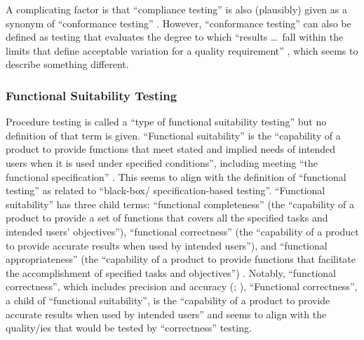 A complicating factor is that ``compliance testing'' is also
(plausibly) given as a synonym of ``conformance testing''
\citep[p.~43]{Kam2008}. However, ``conformance
testing'' can also be defined as testing that evaluates the degree
to which ``results \dots\ fall within the limits that define
acceptable variation for a quality requirement''
\citep[p.~93]{IEEE2017}, which seems to
describe something different.


\subsubsection{Functional Suitability Testing}
Procedure testing is
called a ``type of functional suitability testing''
\citep[p.~7]{IEEE2022} but no definition of that term is given.
``Functional suitability'' is the
``capability of a product to provide functions that meet stated and
implied needs of intended users when it is used under specified
conditions'', including meeting ``the functional specification''
\citep{ISO_IEC2023a}. This seems to align with the definition of
``functional testing'' as related to ``black-box/%
specification-based testing''.
\ifnotpaper
    ``Functional suitability'' has
    three child terms: ``functional completeness'' (the ``capability of
    a product to provide a set of functions that covers all the
    specified tasks and intended users' objectives''), ``functional
    correctness'' (the ``capability of a product to provide accurate
    results when used by intended users''), and ``functional
    appropriateness'' (the ``capability of a product to provide
    functions that facilitate the accomplishment of specified tasks and
    objectives'') \citep{ISO_IEC2023a}. Notably, ``functional
    correctness'', which includes precision and accuracy
    (\citealp{ISO_IEC2023a}; \citealpISTQB{}), \else ``Functional
    correctness'', a child of ``functional suitability'', is the ``capability
    of a product to provide accurate results when used by intended users''
    \cite{ISO_IEC2023a} and \fi seems to align with
the quality/ies that would be tested by ``correctness'' testing.

